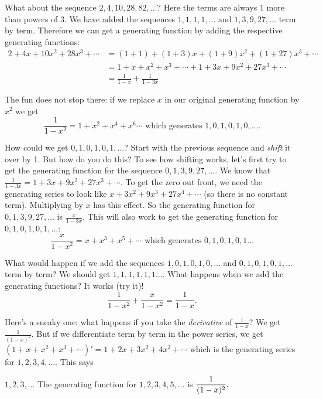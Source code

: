 \documentclass[12pt]{article}
\begin{document}
What about the sequence $2, 4, 10, 28, 82, \ldots$?  Here the terms are always 1 more than powers of 3.  We have added the sequences $1,1,1,1,\ldots$ and $1,3,9, 27,\ldots$ term by term.  Therefore we can get a generating function by adding the respective generating functions:
\begin{align*}
2 + 4x + 10x^2 + 28x^3 + \cdots  & = (1 + 1) + (1 + 3)x + (1 + 9)x^2 + (1 + 27)x^3 + \cdots \\
& = 1 + x + x^2 + x^3 + \cdots + 1 + 3x + 9x^2 + 27x^3 + \cdots \\
& = \frac{1}{1-x} + \frac{1}{1-3x}
\end{align*}
 
The fun does not stop there: if we replace $x$ in our original generating function by $x^2$ we get
 \[\frac{1}{1-x^2} = 1 + x^2  + x^4 + x^6\cdots \mbox{ which generates } 1, 0, 1, 0, 1, 0, \ldots.\]
 
How could we get $0,1,0,1,0,1,\ldots$?  Start with the previous sequence and {\em shift} it over by 1.  But how do you do this?  To see how shifting works, let's first try to get the generating function for the sequence $0, 1, 3, 9, 27, \ldots$.  We know that $\frac{1}{1-3x} = 1 + 3x + 9x^2 + 27x^3 + \cdots$.  To get the zero out front, we need the generating series to look like $x + 3x^2 + 9x^3 + 27x^4+ \cdots$ (so there is no constant term).  Multiplying by $x$ has this effect.  So the generating function for $0, 1, 3, 9, 27, \ldots$ is $\frac{x}{1-3x}$.  This will also work to get the generating function for $0,1,0,1,0,1,\ldots$:
 \[\frac{x}{1-x^2} = x + x^3 + x^5 + \cdots \mbox{ which generates } 0, 1, 0, 1, 0 , 1 \ldots\]
 
What would happen if we add the sequences $1,0,1,0,1,0,\ldots$ and $0,1,0,1,0,1,\ldots$ term by term?  We should get $1,1,1,1,1,1\ldots$.  What happens when we add the generating functions?  It works (try it)!
 \[\frac{1}{1-x^2} + \frac{x}{1-x^2} = \frac{1}{1-x}.\]
 

Here's a sneaky one: what happens if you take the \emph{derivative} of $\frac{1}{1-x}$?  We get $\frac{1}{(1-x)^2}$.  But if we differentiate term by term in the power series, we get $(1 + x + x^2 + x^3 + \cdots)' = 1 + 2x + 3x^2 + 4x^3 + \cdots $ which is the generating series for $1, 2, 3, 4, \ldots$.  This says

\begin{defbox}{$1,2,3,\ldots$}
 The generating function for $1, 2, 3, 4, 5, \ldots$ is $\displaystyle\frac{1}{(1-x)^2}.$
\end{defbox}
\end{document}
